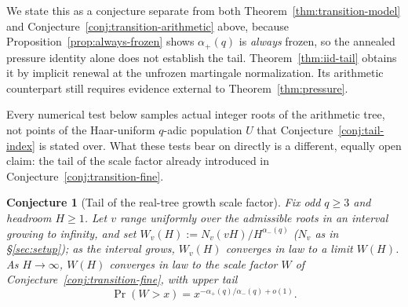 \documentclass[11pt]{article}
\newtheorem{conjecture}[theorem]{Conjecture}
\theoremstyle{remark}
\begin{document}
We state this as a conjecture separate from both
Theorem~\ref{thm:transition-model} and
Conjecture~\ref{conj:transition-arithmetic} above, because
Proposition~\ref{prop:always-frozen} shows $\alpha_+(q)$ is
\emph{always} frozen, so the annealed pressure identity alone does not
establish the tail. Theorem~\ref{thm:iid-tail} obtains it by implicit
renewal at the unfrozen martingale normalization. Its arithmetic
counterpart still requires evidence external to
Theorem~\ref{thm:pressure}.

Every numerical test below samples actual integer roots of the
arithmetic tree, not points of the Haar-uniform $q$-adic population
$U$ that Conjecture~\ref{conj:tail-index} is stated over. What these
tests bear on directly is a different, equally open claim: the tail of
the scale factor already introduced in
Conjecture~\ref{conj:transition-fine}.

\begin{conjecture}[Tail of the real-tree growth scale factor]\label{conj:real-tree-tail}
Fix odd $q\ge3$ and headroom $H\ge1$. Let $v$ range uniformly over the
admissible roots in an interval growing to infinity, and set
$W_v(H):=N_v(vH)/H^{\alpha_-(q)}$ ($N_v$ as in \S\ref{sec:setup}); as
the interval grows, $W_v(H)$ converges in law to a limit $W(H)$. As
$H\to\infty$, $W(H)$ converges in law to the scale factor $W$ of
Conjecture~\ref{conj:transition-fine}, with upper tail
\[
 \Pr(W>x) = x^{-\alpha_+(q)/\alpha_-(q)+o(1)}.
\]
\end{conjecture}
\end{document}
